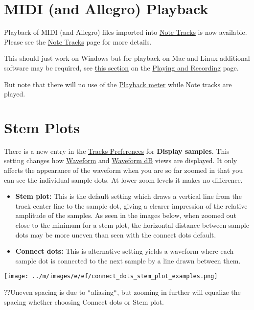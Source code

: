 \documentclass[]{book}
\begin{document}
\begin{multicols}{2}

\section{MIDI (and Allegro) Playback}


Playback of MIDI (and Allegro) files imported into 
\hyperref[note_tracks_]{Note Tracks}
 is now available.  Please see the 
\hyperref[note_tracks_]{Note Tracks}
 page for more details.

This should just work on Windows but for playback on Mac and Linux additional software may be required, see 
\hyperref[playing_and_recording__midi]{this section}
 on the 
\hyperref[playing_and_recording_]{Playing and Recording}
 page.

But note that there will no use of the 
\hyperref[meter_toolbar__playback]{Playback meter}
 while Note tracks are played. 



\section{Stem Plots}


There is a new entry in the 
\hyperref[tracks_preferences_]{Tracks Preferences}
 for \textbf{Display samples}.  This setting changes how 
\hyperref[audacity_waveform_]{Waveform}
 and 
\hyperref[audacity_waveform__db]{Waveform dB}
 views are displayed.  It only affects the appearance of the waveform when you are so far zoomed in that you can see the individual sample dots.  At lower zoom levels it makes no difference.  
\begin{itemize}
\item \textbf{Stem plot:} This is the default setting which draws a vertical line from the track center line to the sample dot, giving a clearer impression of the relative amplitude of the samples. As seen in the images below, when zoomed out close to the minimum for a stem plot, the horizontal distance between sample dots may be more uneven than seen with the connect dots default.   
\item \textbf{Connect dots:} This is alternative setting yields a waveform where each sample dot is connected to the next sample by a line drawn between them.  
\end{itemize}
\par\texttt{[image: ../m/images/e/ef/connect\_dots\_stem\_plot\_examples.png]}\par??Uneven spacing is due to \texttt{{}"{}}aliasing\texttt{{}"{}}, but zooming in further will equalize the spacing whether choosing Connect dots or Stem plot.



\end{multicols}
\end{document}
